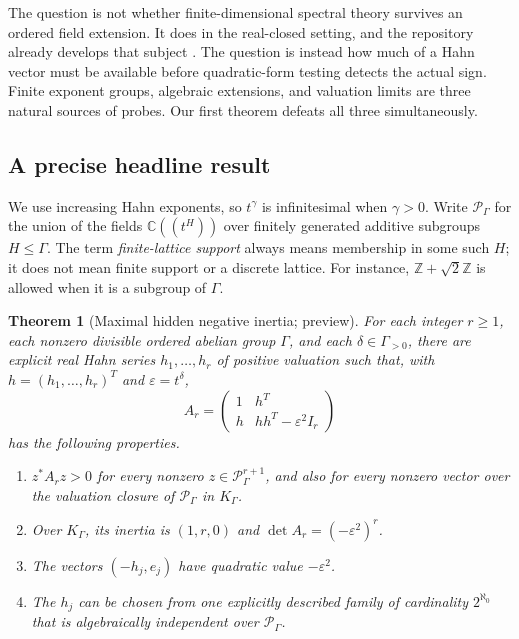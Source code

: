 \documentclass[11pt,oneside]{article}
\newtheorem{theorem}{Theorem}[section]
\theoremstyle{definition}
\theoremstyle{remark}
\newcommand{\C}{\mathbb C}
\newcommand{\Z}{\mathbb Z}
\newcommand{\eps}{\varepsilon}
\begin{document}
The question is not whether finite-dimensional spectral theory survives
an ordered field extension. It does in the real-closed setting, and the
repository already develops that subject \cite{repo-spectral}. The
question is instead how much of a Hahn vector must be available before
quadratic-form testing detects the actual sign. Finite exponent groups,
algebraic extensions, and valuation limits are three natural sources of
probes. Our first theorem defeats all three simultaneously.

\subsection{A precise headline result}

We use increasing Hahn exponents, so $t^\gamma$ is infinitesimal when
$\gamma>0$. Write $\mathscr P_\Gamma$ for the union of the fields
$\C((t^H))$ over finitely generated additive subgroups $H\le\Gamma$.
The term \emph{finite-lattice support} always means membership in some
such $H$; it does not mean finite support or a discrete lattice.
For instance, $\Z+\sqrt2\Z$ is allowed when it is a subgroup of $\Gamma$.

\begin{theorem}[Maximal hidden negative inertia; preview]\label{hnd:thm:preview}
For each integer $r\ge1$, each nonzero divisible ordered abelian group
$\Gamma$, and each $\delta\in\Gamma_{>0}$, there are explicit real Hahn
series $h_1,\ldots,h_r$ of positive valuation such that, with
$h=(h_1,\ldots,h_r)^T$ and $\eps=t^\delta$,
\begin{equation}\label{hnd:eq:mainmatrix}
 A_r=\begin{pmatrix}
 1&h^T\\ h&hh^T-\eps^2 I_r
 \end{pmatrix}
\end{equation}
has the following properties.
\begin{enumerate}[label=(\roman*)]
\item $z^*A_rz>0$ for every nonzero
$z\in\mathscr P_\Gamma^{r+1}$, and also for every nonzero vector over the
valuation closure of $\mathscr P_\Gamma$ in $K_\Gamma$.
\item Over $K_\Gamma$, its inertia is $(1,r,0)$ and
$\det A_r=(-\eps^2)^r$.
\item The vectors $(-h_j,e_j)$ have quadratic value $-\eps^2$.
\item The $h_j$ can be chosen from one explicitly described family of
cardinality $2^{\aleph_0}$ that is algebraically independent over
$\mathscr P_\Gamma$.
\end{enumerate}
\end{theorem}
\end{document}
